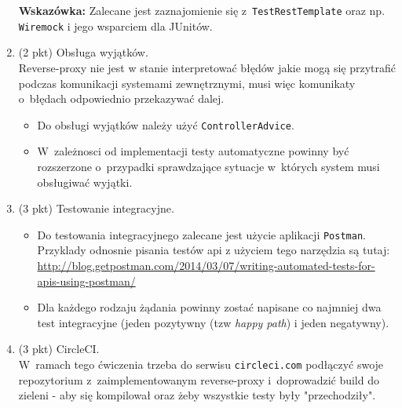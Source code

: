 \documentclass[12pt]{article}
\begin{document}
\begin{enumerate}
\textbf{Wskazówka:} Zalecane jest zaznajomienie się z~\texttt{TestRestTemplate} oraz np. \texttt{Wiremock} i jego wsparciem dla JUnitów.

        \item\label{exc:spring_exception_handling}
            (2 pkt) Obsługa wyjątków.\\
Reverse-proxy nie jest w stanie interpretować błędów jakie mogą się przytrafić podczas komunikacji systemami zewnętrznymi, musi więc komunikaty o~błędach odpowiednio przekazywać dalej.
\begin{itemize}
        \item Do obsługi wyjątków należy użyć \texttt{ControllerAdvice}.
        \item W~zależnosci od implementacji testy automatyczne powinny być rozszerzone o~przypadki sprawdzające sytuacje w~których system musi obsługiwać wyjątki.
\end{itemize}

        \item\label{exc:postman}
            (3 pkt) Testowanie integracyjne.\\
\begin{itemize}
        \item Do testowania integracyjnego zalecane jest użycie aplikacji \texttt{Postman}. Przyklady odnosnie pisania testów api z użyciem tego narzędzia są tutaj: \\\url{http://blog.getpostman.com/2014/03/07/writing-automated-tests-for-apis-using-postman/}
        \item Dla każdego rodzaju żądania powinny zostać napisane co najmniej dwa test integracyjne (jeden pozytywny (tzw \emph{happy path}) i jeden negatywny).
\end{itemize}

        \item\label{exc:travis}
            (3 pkt) CircleCI.\\
W~ramach tego ćwiczenia trzeba do serwisu \texttt{circleci.com} podłączyć swoje repozytorium z~zaimplementowanym reverse-proxy i~doprowadzić build do zieleni - aby się kompilował oraz żeby wszystkie testy były "przechodziły".

    \end{enumerate}
\end{document}
